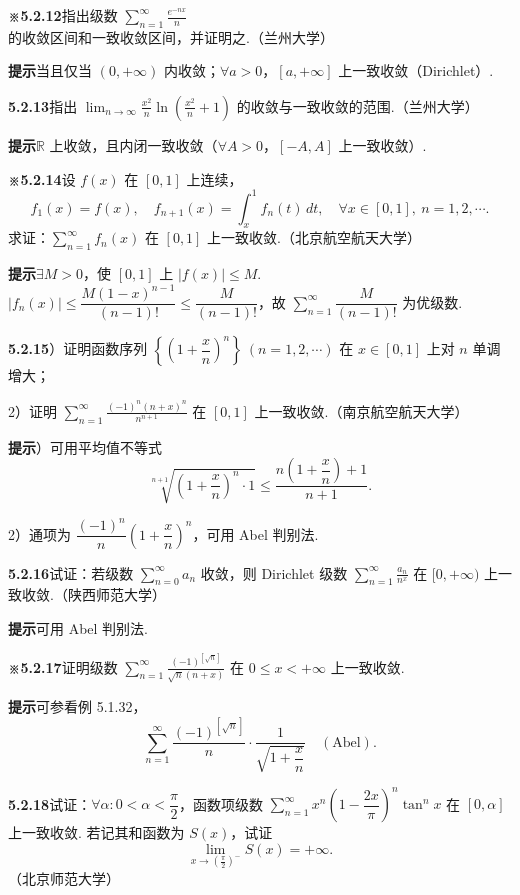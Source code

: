 \documentclass[UTF8,12pt,a4paper,fontset=fandol]{ctexart}
\begin{document}
\noindent\textbf{※5.2.12}\quad 指出级数 $\displaystyle\sum_{n=1}^{\infty}\frac{e^{-nx}}n$ 的收敛区间和一致收敛区间，并证明之.（兰州大学）

\noindent\textbf{提示}\quad 当且仅当 $(0,+\infty)$ 内收敛；$\forall a>0$，$[a,+\infty]$ 上一致收敛（Dirichlet）.

\noindent\textbf{5.2.13}\quad 指出 $\displaystyle\lim_{n\to\infty}\frac{x^2}{n}\ln\left(\frac{x^2}{n}+1\right)$ 的收敛与一致收敛的范围.（兰州大学）

\noindent\textbf{提示}\quad $\mathbb R$ 上收敛，且内闭一致收敛（$\forall A>0$，$[-A,A]$ 上一致收敛）.

\noindent\textbf{※5.2.14}\quad 设 $f(x)$ 在 $[0,1]$ 上连续，
\[
  f_1(x)=f(x),\quad f_{n+1}(x)=\int_x^1 f_n(t)\,dt,\quad \forall x\in[0,1],\ n=1,2,\cdots.
\]
求证：$\displaystyle\sum_{n=1}^{\infty}f_n(x)$ 在 $[0,1]$ 上一致收敛.（北京航空航天大学）

\noindent\textbf{提示}\quad $\exists M>0$，使 $[0,1]$ 上 $|f(x)|\le M$.
$|f_n(x)|\le\dfrac{M(1-x)^{n-1}}{(n-1)!}\le\dfrac M{(n-1)!}$，故
$\displaystyle\sum_{n=1}^{\infty}\dfrac M{(n-1)!}$ 为优级数.

\noindent\textbf{5.2.15}）证明函数序列
$\left\{\left(1+\dfrac xn\right)^n\right\}\ (n=1,2,\cdots)$ 在 $x\in[0,1]$ 上对 $n$ 单调增大；

2）证明 $\displaystyle\sum_{n=1}^{\infty}\frac{(-1)^n(n+x)^n}{n^{n+1}}$ 在 $[0,1]$ 上一致收敛.（南京航空航天大学）

\noindent\textbf{提示}）可用平均值不等式
\[
  \sqrt[n+1]{\left(1+\frac xn\right)^n\cdot1}
  \le\frac{n\left(1+\dfrac xn\right)+1}{n+1}.
\]

2）通项为 $\dfrac{(-1)^n}{n}\left(1+\dfrac xn\right)^n$，可用 Abel 判别法.

\noindent\textbf{5.2.16}\quad 试证：若级数 $\displaystyle\sum_{n=0}^{\infty}a_n$ 收敛，则 Dirichlet 级数
$\displaystyle\sum_{n=1}^{\infty}\frac{a_n}{n^x}$ 在 $[0,+\infty)$ 上一致收敛.（陕西师范大学）

\noindent\textbf{提示}\quad 可用 Abel 判别法.

\noindent\textbf{※5.2.17}\quad 证明级数
$\displaystyle\sum_{n=1}^{\infty}\frac{(-1)^{[\sqrt n]}}{\sqrt n(n+x)}$ 在 $0\le x<+\infty$ 上一致收敛.

\noindent\textbf{提示}\quad 可参看例 5.1.32，
\[
  \sum_{n=1}^{\infty}\frac{(-1)^{[\sqrt n]}}n\cdot\frac1{\sqrt{1+\dfrac xn}}\quad(\text{Abel}).
\]

\noindent\textbf{5.2.18}\quad 试证：$\forall\alpha:0<\alpha<\dfrac\pi2$，函数项级数
$\displaystyle\sum_{n=1}^{\infty}x^n\left(1-\dfrac{2x}{\pi}\right)^n\tan^n x$ 在 $[0,\alpha]$ 上一致收敛. 若记其和函数为
$S(x)$，试证
\[
  \lim_{x\to(\frac\pi2)^-}S(x)=+\infty.
\]
（北京师范大学）
\end{document}
